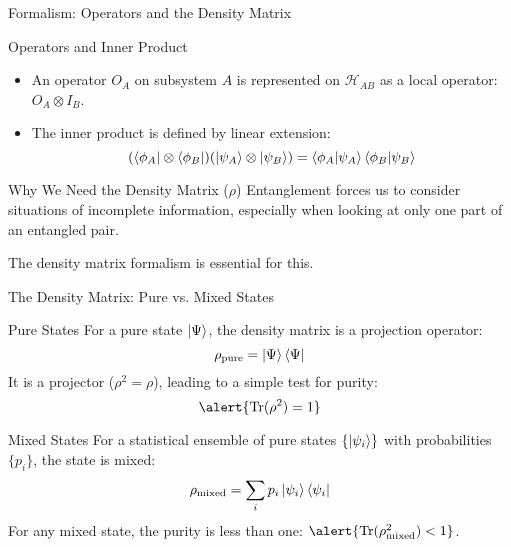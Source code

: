 
\begin{frame}{Formalism: Operators and the Density Matrix}
  \begin{block}{Operators and Inner Product}
    \begin{itemize}
      \item An operator $O_A$ on subsystem $A$ is represented on
        $\mathcal{H}_{AB}$ as a \alert{local operator}: $O_A \otimes I_B$.
        \pause
      \item The inner product is defined by linear extension:
        \[
          (\bra{\phi_A} \otimes \bra{\phi_B}) (\ket{\psi_A} \otimes
          \ket{\psi_B}) = \braket{\phi_A | \psi_A} \braket{\phi_B | \psi_B}
        \]
    \end{itemize}
  \end{block}
  \pause
  \begin{alertblock}{Why We Need the Density Matrix ($\rho$)}
    Entanglement forces us to consider situations of incomplete information,
    especially when looking at only one part of an entangled pair.

    The density matrix formalism is essential for this.
  \end{alertblock}
\end{frame}


\begin{frame}{The Density Matrix: Pure vs. Mixed States}
  \begin{block}{Pure States}
    For a pure state $\ket{\Psi}$, the density matrix is a projection operator:
    \begin{equation}
      \rho_{\text{pure}} = \ket{\Psi}\bra{\Psi}
    \end{equation}
    It is a projector ($\rho^2 = \rho$), leading to a simple test for purity:
    \[
      \alert{\Tr(\rho^2) = 1}
    \]
  \end{block}
  \pause
  \vspace{-1em}
  \begin{block}{Mixed States}
    For a statistical ensemble of pure states $\{\ket{\psi_i}\}$ with
    probabilities $\{p_i\}$, the state is mixed:
    \begin{equation}
      \rho_{\text{mixed}} = \sum_i p_i \ket{\psi_i}\bra{\psi_i}
    \end{equation}
    For any mixed state, the purity is less than one:
    $\alert{\Tr(\rho_{\text{mixed}}^2) < 1}$.
  \end{block}
\end{frame}

